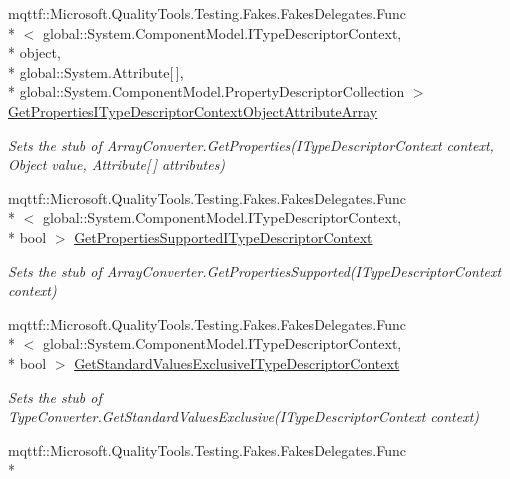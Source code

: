 \begin{DoxyCompactItemize}
mqttf\-::\-Microsoft.\-Quality\-Tools.\-Testing.\-Fakes.\-Fakes\-Delegates.\-Func\\*
$<$ global\-::\-System.\-Component\-Model.\-I\-Type\-Descriptor\-Context, \\*
object, \\*
global\-::\-System.\-Attribute\mbox{[}$\,$\mbox{]}, \\*
global\-::\-System.\-Component\-Model.\-Property\-Descriptor\-Collection $>$ \hyperlink{class_system_1_1_component_model_1_1_fakes_1_1_stub_array_converter_a4b7d38c4f000d3b9a3b0215e98cb1324}{Get\-Properties\-I\-Type\-Descriptor\-Context\-Object\-Attribute\-Array}
\begin{DoxyCompactList}\small\item\em Sets the stub of Array\-Converter.\-Get\-Properties(\-I\-Type\-Descriptor\-Context context, Object value, Attribute\mbox{[}$\,$\mbox{]} attributes)\end{DoxyCompactList}\item 
mqttf\-::\-Microsoft.\-Quality\-Tools.\-Testing.\-Fakes.\-Fakes\-Delegates.\-Func\\*
$<$ global\-::\-System.\-Component\-Model.\-I\-Type\-Descriptor\-Context, \\*
bool $>$ \hyperlink{class_system_1_1_component_model_1_1_fakes_1_1_stub_array_converter_aec7b053372dcce685c6020364f26c609}{Get\-Properties\-Supported\-I\-Type\-Descriptor\-Context}
\begin{DoxyCompactList}\small\item\em Sets the stub of Array\-Converter.\-Get\-Properties\-Supported(\-I\-Type\-Descriptor\-Context context)\end{DoxyCompactList}\item 
mqttf\-::\-Microsoft.\-Quality\-Tools.\-Testing.\-Fakes.\-Fakes\-Delegates.\-Func\\*
$<$ global\-::\-System.\-Component\-Model.\-I\-Type\-Descriptor\-Context, \\*
bool $>$ \hyperlink{class_system_1_1_component_model_1_1_fakes_1_1_stub_array_converter_a8a8d49a420226e194f4202eb34cbd27f}{Get\-Standard\-Values\-Exclusive\-I\-Type\-Descriptor\-Context}
\begin{DoxyCompactList}\small\item\em Sets the stub of Type\-Converter.\-Get\-Standard\-Values\-Exclusive(\-I\-Type\-Descriptor\-Context context)\end{DoxyCompactList}\item 
mqttf\-::\-Microsoft.\-Quality\-Tools.\-Testing.\-Fakes.\-Fakes\-Delegates.\-Func\\*

\end{DoxyCompactItemize}
